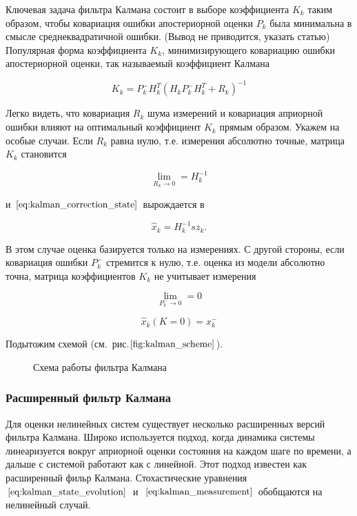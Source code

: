 \documentclass[12pt,a4paper]{article}
\begin{document}
Ключевая задача фильтра Калмана состоит в выборе коэффициента $K_k$ таким образом, чтобы ковариация ошибки апостериорной оценки $P_k$ была минимальна в смысле среднеквадратичной ошибки. (Вывод не приводится, указать статью) Популярная форма коэффициента $K_k$, минимизирующего ковариацию ошибки апостериорной оценки, так называемый коэффициент Калмана

$$ K_k = P_k^-  H_k^T (H_k P_k^- H_k^T + R_k)^{-1}$$

Легко видеть, что ковариация $R_k$ шума измерений и ковариация априорной ошибки влияют на оптимальный коэффициент $K_k$ прямым образом. Укажем на особые случаи. Если $R_k$ равна нулю, т.е. измерения абсолютно точные, матрица $K_k$ становится

$$ \lim\limits_{R_k\to0} = H_k^{-1} $$

и $\eqref{eq:kalman_correction_state}$ вырождается в 

$$ \hat x_k = H_k^{-1}s z_k. $$

В этом случае оценка базируется только на измерениях. С другой стороны, если ковариация ошибки $P_k^-$ стремится к нулю, т.е. оценка из модели абсолютно точна, матрица коэффициентов $K_k$ не учитывает измерения

$$ \lim\limits_{P_k^-\to0} = 0 $$

$$ \hat x_k(K = 0) = x_k^- $$

Подытожим схемой (см.~рис.$\ref{fig:kalman_scheme}$).

\begin{figure}
	\caption{Схема работы фильтра Калмана}
	\label{fig:kalman_scheme}
\end{figure}

\subsubsection{Расширенный фильтр Калмана}

Для оценки нелинейных систем существует несколько расширенных версий фильтра Калмана. Широко используется подход, когда динамика системы линеаризуется вокруг априорной оценки состояния на каждом шаге по времени, а дальше с системой работают как с линейной. Этот подход известен как расширенный фильр Калмана. Стохастические уравнения~$\eqref{eq:kalman_state_evolution}$~и~$\eqref{eq:kalman_measurement}$ обобщаются на нелинейный случай.
\end{document}

